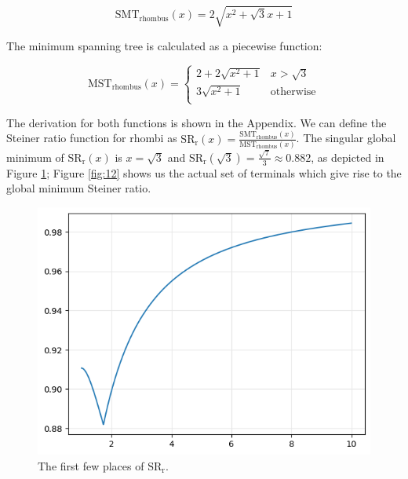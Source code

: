 \documentclass{mpaper}
\begin{document}
\begin{equation}
  \label{eq:1}
  \operatorname{SMT_{rhombus}}(x)=2\sqrt{x^2+\sqrt{3}x+1}
\end{equation}

The minimum spanning tree is calculated as a piecewise function:

\begin{equation}
  \label{eq:2}
  \operatorname{MST_{rhombus}}(x)=  
  \begin{cases} 
    2+2\sqrt{x^2+1} & x >\sqrt{3} \\
    3\sqrt{x^2+1} & \text{otherwise} \\
  \end{cases}
\end{equation}

The derivation for both functions is shown in the Appendix. We can define the Steiner ratio function for rhombi as $\operatorname{SR_r}(x) = \frac{\operatorname{SMT_{rhombus}}(x)}{\operatorname{MST_{rhombus}}(x)}$. The singular global minimum of $\operatorname{SR_r}(x)$ is $x=\sqrt{3}$ and $\operatorname{SR_r}(\sqrt{3})=\frac{\sqrt{7}}{3}\approx 0.882$, as depicted in Figure \ref{fig:11}; Figure \ref{fig:12} shows us the actual set of terminals which give rise to the global minimum Steiner ratio.

\begin{figure}[h!]
  \begin{center}
  \includegraphics[scale=0.5]{plot10.png}
  \end{center}
  \caption{\label{fig:11} The first few places of $\operatorname{SR_{r}}$.}
\end{figure}
\end{document}
